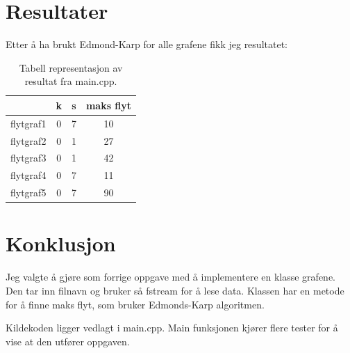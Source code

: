 \documentclass[12pt,a4paper]{article}
\begin{document}
\section{Resultater}
Etter å ha brukt Edmond-Karp for alle grafene fikk jeg resultatet:
\begin{table}[h]
    \centering
    \begin{tabular}{lccc}
        \toprule
        & \textbf{k} & \textbf{s} & \textbf{maks flyt} \\
        \midrule
        flytgraf1 & 0 & 7 & 10 \\
        flytgraf2 & 0 & 1 & 27 \\
        flytgraf3 & 0 & 1 & 42 \\
        flytgraf4 & 0 & 7 & 11 \\
        flytgraf5 & 0 & 7 & 90 \\
        \bottomrule
    \end{tabular}
    \caption{Tabell representasjon av resultat fra main.cpp.}
    \label{tab:my_table}
\end{table}

\section{Konklusjon}
Jeg valgte å gjøre som forrige oppgave med å implementere en klasse grafene. Den tar inn filnavn og bruker så fstream for å lese data. Klassen har en metode for å finne maks flyt, som bruker Edmonds-Karp algoritmen.

Kildekoden ligger vedlagt i main.cpp. Main funksjonen kjører flere tester for å vise at den utfører oppgaven.
\end{document}
